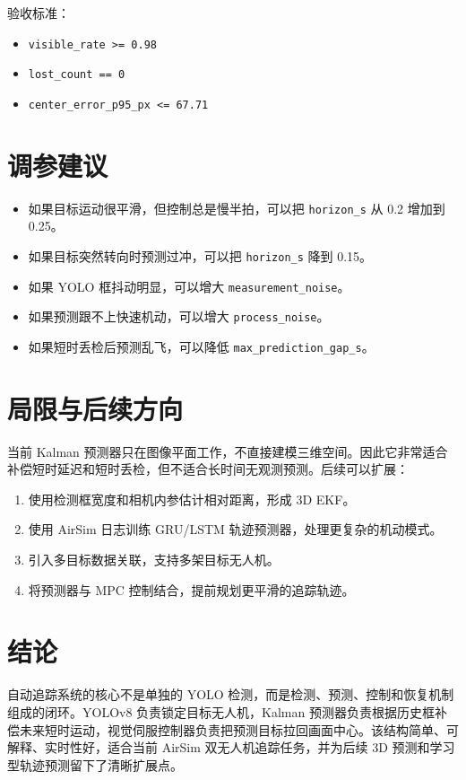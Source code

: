\documentclass[UTF8,a4paper,11pt]{ctexart}
\begin{document}
验收标准：

\begin{itemize}
  \item \texttt{visible\_rate >= 0.98}
  \item \texttt{lost\_count == 0}
  \item \texttt{center\_error\_p95\_px <= 67.71}
\end{itemize}

\section{调参建议}

\begin{itemize}
  \item 如果目标运动很平滑，但控制总是慢半拍，可以把 \texttt{horizon\_s} 从 0.2 增加到 0.25。
  \item 如果目标突然转向时预测过冲，可以把 \texttt{horizon\_s} 降到 0.15。
  \item 如果 YOLO 框抖动明显，可以增大 \texttt{measurement\_noise}。
  \item 如果预测跟不上快速机动，可以增大 \texttt{process\_noise}。
  \item 如果短时丢检后预测乱飞，可以降低 \texttt{max\_prediction\_gap\_s}。
\end{itemize}

\section{局限与后续方向}

当前 Kalman 预测器只在图像平面工作，不直接建模三维空间。因此它非常适合补偿短时延迟和短时丢检，但不适合长时间无观测预测。后续可以扩展：

\begin{enumerate}
  \item 使用检测框宽度和相机内参估计相对距离，形成 3D EKF。
  \item 使用 AirSim 日志训练 GRU/LSTM 轨迹预测器，处理更复杂的机动模式。
  \item 引入多目标数据关联，支持多架目标无人机。
  \item 将预测器与 MPC 控制结合，提前规划更平滑的追踪轨迹。
\end{enumerate}

\section{结论}

自动追踪系统的核心不是单独的 YOLO 检测，而是检测、预测、控制和恢复机制组成的闭环。YOLOv8 负责锁定目标无人机，Kalman 预测器负责根据历史框补偿未来短时运动，视觉伺服控制器负责把预测目标拉回画面中心。该结构简单、可解释、实时性好，适合当前 AirSim 双无人机追踪任务，并为后续 3D 预测和学习型轨迹预测留下了清晰扩展点。
\end{document}
